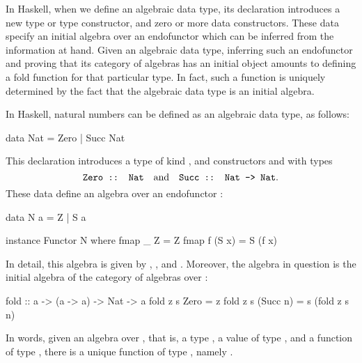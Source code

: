In Haskell, when we define an algebraic data type, its declaration
introduces a new type or type constructor, and zero or more data
constructors. These data specify an initial algebra over an
endofunctor which can be inferred from the information at hand. Given
an algebraic data type, inferring such an endofunctor and proving that
its category of algebras has an initial object amounts to defining a
fold function for that particular type. In fact, such a function is
uniquely determined by the fact that the algebraic data type is an
initial algebra.

\begin{example}
  \label{ex:algebra-natural-haskell}


  In Haskell, natural numbers can be defined as an algebraic data
  type, as follows:
  \begin{codehaskell}
data Nat = Zero | Succ Nat
  \end{codehaskell}
  This declaration introduces a type  of kind
  \texthaskell{*}, and constructors  and
   with types
  \begin{equation*}
    \text{\texttt{Zero :: Nat}}
    \quad
    \text{and}
    \quad
    \text{\texttt{Succ :: Nat -> Nat}}
    \text{.}
  \end{equation*}
  These data define an algebra over an endofunctor :
  \begin{codehaskell}
data N a = Z | S a

instance Functor N where
  fmap _ Z     = Z
  fmap f (S x) = S (f x)
\end{codehaskell}
  In detail, this algebra is given by ,
  , and . Moreover, the algebra in
  question is the initial algebra of the category of algebras over
  :
  \begin{codehaskell}
fold :: a -> (a -> a) -> Nat -> a
fold z s Zero     = z
fold z s (Succ n) = s (fold z s n)
  \end{codehaskell}
  In words, given an algebra over , that is, a type
  , a value  of type ,
  and a function  of type , there
  is a unique function of type , namely
  .


\end{example}
